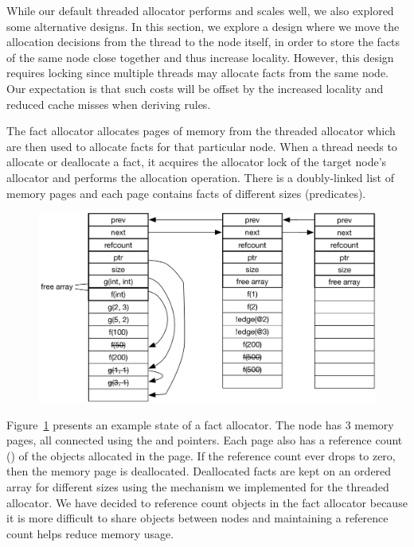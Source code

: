 While our default threaded allocator performs and scales well, we also explored
some alternative designs. In this section, we explore a design where we move the
allocation decisions from the thread to the node itself, in order to store the
facts of the same node close together and thus increase locality. However, this
design requires locking since multiple threads may allocate facts from the same
node. Our expectation is that such costs will be offset by the increased
locality and reduced cache misses when deriving rules.

The fact allocator allocates pages of memory from the threaded allocator which
are then used to allocate facts for that particular node. When a thread needs to
allocate or deallocate a fact, it acquires the allocator lock of the target
node's allocator and performs the allocation operation. There is a doubly-linked
list of memory pages and each page contains facts of different sizes
(predicates).

\begin{figure}[ht]
   \begin{center}
      \includegraphics[width=0.7\linewidth]{figures/implementation/fact_allocator.pdf}
   \end{center}


   \label{fig:implementation:fact_allocator}
\end{figure}

Figure~\ref{fig:implementation:fact_allocator} presents an example state of a
fact allocator. The node has 3 memory pages, all connected using the 
and  pointers. Each page also has a reference count ()
of the objects allocated in the page. If the reference count ever drops to zero,
then the memory page is deallocated. Deallocated facts are kept on an ordered
array for different sizes using the mechanism we implemented for the threaded
allocator. We have decided to reference count objects in the fact allocator
because it is more difficult to share objects between nodes and maintaining a
reference count helps reduce memory usage.

